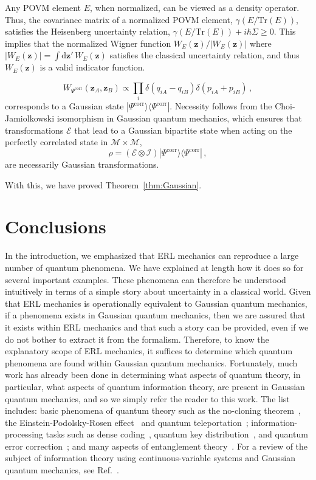 \documentclass[pra,superscriptaddress,nofootinbib,12pt]{revtex4-2}
\begin{document}
Any POVM element $E$, when normalized, can be viewed as a density operator.  Thus, the covariance matrix of a normalized POVM element, $\gamma (E/\mathrm{Tr}(E))$, satisfies the Heisenberg uncertainty relation, $\gamma (E/\mathrm{Tr}(E))+i\hbar \Sigma \geq 0$.  This implies that the normalized Wigner function $W_{E}(\mathbf{z})/|W_{E}(\mathbf{z})|$ where $|W_{E}(\mathbf{z})|=\int \mathrm{d}\mathbf{z}'\,W_{E}(\mathbf{z})$ satisfies the classical uncertainty relation, and thus $W_{E}(\mathbf{z})$ is a valid indicator function.

\begin{equation}
W_{\Psi^{\text{corr}}}(\mathbf{z}_A,\mathbf{z}_B) \propto \prod_i \delta(q_{iA}-q_{iB})\delta(p_{iA}+p_{iB})\,,
\end{equation}
corresponds to a Gaussian state $| \Psi^{\text{corr}} \rangle \langle \Psi^{\text{corr}}|$.  Necessity follows from the Choi-Jamiolkowski isomorphism in Gaussian quantum mechanics, which ensures that transformations $\mathcal{E}$ that lead to a Gaussian bipartite state when acting on the perfectly correlated state in $\mathcal{M} \times \mathcal{M}$,
\begin{equation}
  \rho =(\mathcal{E}\otimes \mathcal{I}) | \Psi^{\text{corr}} \rangle \langle \Psi^{\text{corr}}|\,,
\end{equation}
are necessarily Gaussian transformations.

With this, we have proved Theorem~\ref{thm:Gaussian}.


\section{Conclusions}

In the introduction, we emphasized that ERL mechanics can reproduce a large number of quantum phenomena. We have explained at length how it does so for several important examples.  These phenomena can therefore be understood intuitively in terms of a simple story about uncertainty in a classical world. Given that ERL mechanics is operationally equivalent to Gaussian quantum mechanics, if a phenomena exists in Gaussian quantum mechanics, then we are assured that it exists within ERL mechanics and that such a story can be provided, even if we do not bother to extract it from the formalism.  Therefore, to know the explanatory scope of ERL mechanics,  it suffices to determine which quantum phenomena are found within Gaussian quantum mechanics.  Fortunately, much work has already been done in determining what aspects of quantum theory, in particular, what aspects of quantum information theory, are present in Gaussian quantum mechanics, and so we simply refer the reader to this work.  The list includes: basic phenomena of quantum theory such as the no-cloning theorem~\cite{Cer00}, the Einstein-Podolsky-Rosen effect~\cite{Reid09} and quantum teleportation~\cite{Bra98}; information-processing tasks such as dense coding~\cite{Bra00}, quantum key distribution~\cite{Ral00}, and quantum error correction~\cite{Bra98b}; and many aspects of entanglement theory~\cite{Gie03,Eis03}.  For a review of the subject of information theory using continuous-variable systems and Gaussian quantum mechanics, see Ref.~\cite{Bra05,Wee11}.
\end{document}
